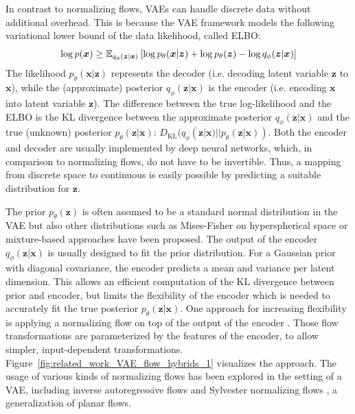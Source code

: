 In contrast to normalizing flows, \acp{VAE} \cite{VAE} can handle discrete data without additional overhead. This is because the \ac{VAE} framework models the following variational lower bound of the data likelihood, called \ac{ELBO}:
\begin{equation}
    \log p(\bm{x}) \geq \mathbb{E}_{q_{\phi}(\bm{z}|\bm{x})}\left[\log p_{\theta}(\bm{x}|\bm{z}) + \log p_{\theta}(\bm{z}) - \log q_{\phi}(\bm{z}|\bm{x})\right]
\end{equation}
The likelihood $p_{\theta}(\bm{x}|\bm{z})$ represents the decoder (i.e. decoding latent variable $\bm{z}$ to $\bm{x}$), while the (approximate) posterior $q_{\phi}(\bm{z}|\bm{x})$ is the encoder (i.e. encoding $\bm{x}$ into latent variable $\bm{z}$). The difference between the true log-likelihood and the ELBO is the KL divergence between the approximate posterior $q_{\phi}(\bm{z}|\bm{x})$ and the true (unknown) posterior $p_{\theta}(\bm{z}|\bm{x})$: $D_{\text{KL}}(q_{\phi}(\bm{z}|\bm{x})||p_{\theta}(\bm{z}|\bm{x}))$.
Both the encoder and decoder are usually implemented by deep neural networks, which, in comparison to normalizing flows, do not have to be invertible. Thus, a mapping from discrete space to continuous is easily possible by predicting a suitable distribution for $\bm{z}$. 

The prior $p_{\theta}(\bm{z})$ is often assumed to be a standard normal distribution in the \ac{VAE} \cite{VAE} but also other distributions such as Mises-Fisher on hyperspherical space \cite{VAEHyperspherical} or mixture-based approaches \cite{VAESemiSupervised, VampPrior} have been proposed. The output of the encoder $q_{\phi}(\bm{z}|\bm{x})$ is usually designed to fit the prior distribution. For a Gaussian prior with diagonal covariance, the encoder predicts a mean and variance per latent dimension. This allows an efficient computation of the KL divergence between prior and encoder, but limits the flexibility of the encoder which is needed to accurately fit the true posterior $p_{\theta}(\bm{z}|\bm{x})$. One approach for increasing flexibility is applying a normalizing flow on top of the output of the encoder \cite{InverseAutoregressiveFlows}. Those flow transformations are parameterized by the features of the encoder, to allow simpler, input-dependent transformations. Figure~\ref{fig:related_work_VAE_flow_hybrids_1} visualizes the approach. The usage of various kinds of normalizing flows has been explored in the setting of a \ac{VAE}, including inverse autoregressive flows \cite{InverseAutoregressiveFlows} and Sylvester normalizing flows \cite{SylvesterNF}, a generalization of planar flows.

